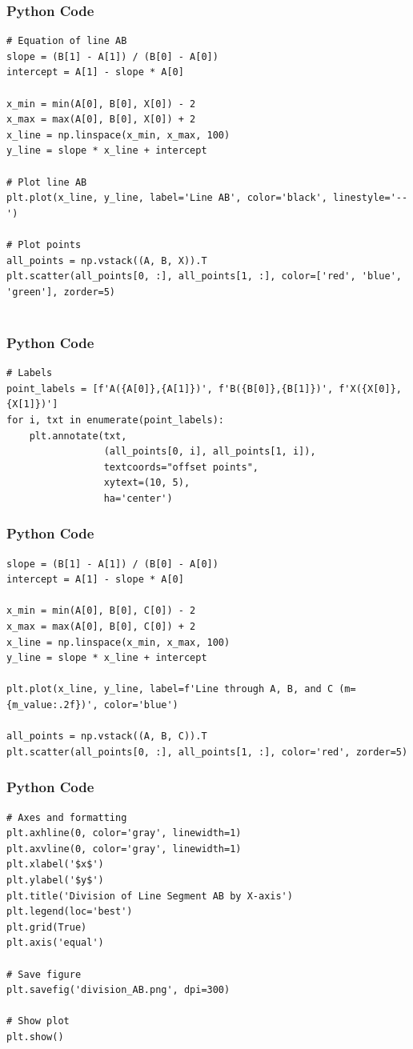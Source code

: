 \documentclass{beamer}
\begin{document}
\begin{frame}[fragile]
    \frametitle{Python Code}
    \begin{lstlisting}
# Equation of line AB
slope = (B[1] - A[1]) / (B[0] - A[0])
intercept = A[1] - slope * A[0]

x_min = min(A[0], B[0], X[0]) - 2
x_max = max(A[0], B[0], X[0]) + 2
x_line = np.linspace(x_min, x_max, 100)
y_line = slope * x_line + intercept

# Plot line AB
plt.plot(x_line, y_line, label='Line AB', color='black', linestyle='--')

# Plot points
all_points = np.vstack((A, B, X)).T
plt.scatter(all_points[0, :], all_points[1, :], color=['red', 'blue', 'green'], zorder=5)


    \end{lstlisting}
\end{frame}

\begin{frame}[fragile]
    \frametitle{Python Code}
    \begin{lstlisting}
# Labels
point_labels = [f'A({A[0]},{A[1]})', f'B({B[0]},{B[1]})', f'X({X[0]},{X[1]})']
for i, txt in enumerate(point_labels):
    plt.annotate(txt,
                 (all_points[0, i], all_points[1, i]),
                 textcoords="offset points",
                 xytext=(10, 5),
                 ha='center')
    \end{lstlisting}
\end{frame}

\begin{frame}[fragile]
    \frametitle{Python Code}
    \begin{lstlisting}
slope = (B[1] - A[1]) / (B[0] - A[0])
intercept = A[1] - slope * A[0]

x_min = min(A[0], B[0], C[0]) - 2
x_max = max(A[0], B[0], C[0]) + 2
x_line = np.linspace(x_min, x_max, 100)
y_line = slope * x_line + intercept

plt.plot(x_line, y_line, label=f'Line through A, B, and C (m={m_value:.2f})', color='blue')

all_points = np.vstack((A, B, C)).T
plt.scatter(all_points[0, :], all_points[1, :], color='red', zorder=5)

    \end{lstlisting}
\end{frame}
\begin{frame}[fragile]
    \frametitle{Python Code}
    \begin{lstlisting}
# Axes and formatting
plt.axhline(0, color='gray', linewidth=1)
plt.axvline(0, color='gray', linewidth=1)
plt.xlabel('$x$')
plt.ylabel('$y$')
plt.title('Division of Line Segment AB by X-axis')
plt.legend(loc='best')
plt.grid(True)
plt.axis('equal')

# Save figure
plt.savefig('division_AB.png', dpi=300)

# Show plot
plt.show()
    \end{lstlisting}
\end{frame}
\end{document}
